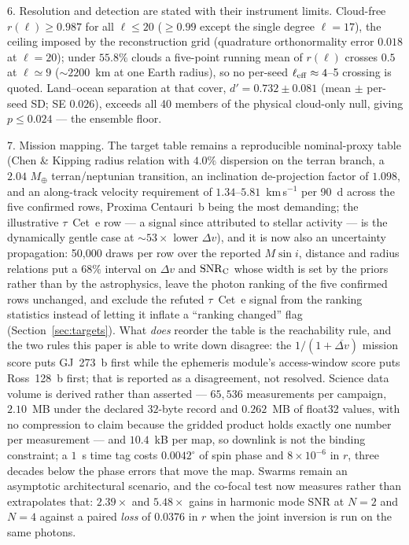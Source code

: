 \documentclass[twocolumn,10pt]{article}
\begin{document}
6. Resolution and detection are stated with their instrument limits.
Cloud-free $r(\ell)\ge0.987$ for all $\ell\le20$ ($\ge0.99$ except the single
degree $\ell=17$), the ceiling imposed by the
reconstruction grid (quadrature orthonormality error $0.018$ at $\ell=20$); under
$55.8\%$ clouds a five-point running mean of $r(\ell)$ crosses $0.5$ at
$\ell\simeq9$ ($\sim2200$~km at one Earth radius), so no per-seed
$\ell_{\rm eff}\approx4$--5 crossing is quoted. Land--ocean separation at that
cover, $d'=0.732\pm0.081$ (mean $\pm$ per-seed SD; SE $0.026$), exceeds all 40 members of the physical cloud-only
null, giving $p\le0.024$ --- the ensemble floor.

7. Mission mapping. The target table remains a reproducible nominal-proxy table
(Chen \& Kipping radius relation with $4.0\%$ dispersion on the terran branch, a
$2.04$ $M_\oplus$ terran/neptunian transition, an inclination de-projection
factor of $1.098$, and an along-track velocity requirement of
$1.34$--$5.81$~km\,s$^{-1}$ per 90~d across the five confirmed rows, Proxima
Centauri~b being the most demanding; the illustrative $\tau$~Cet~e row --- a
signal since attributed to stellar activity \citep{figueira25} --- is the
dynamically gentle case at $\sim53\times$ lower $\Delta v$), and it is now also
an uncertainty propagation: 50{,}000 draws per row over the reported $M\sin i$,
distance and radius relations put a $68\%$ interval on $\Delta v$ and
$\mathrm{SNR}_{\rm C}$ whose width is set by the priors rather than by the
astrophysics, leave the photon ranking of the five confirmed rows unchanged, and
exclude the refuted $\tau$~Cet~e signal from the ranking statistics instead of
letting it inflate a ``ranking changed'' flag (Section~\ref{sec:targets}). What
\emph{does} reorder the table is the reachability rule, and the two rules this
paper is able to write down disagree: the $1/(1+\overline{\Delta v})$ mission
score puts GJ~273~b first while the ephemeris module's access-window score puts
Ross~128~b first; that is reported as a disagreement, not resolved. Science data
volume is derived rather than asserted --- $65{,}536$ measurements per campaign,
$2.10$~MB under the declared $32$-byte record and $0.262$~MB of float32 values,
with no compression to claim because the gridded product holds exactly one
number per measurement --- and $10.4$~kB per map, so downlink is not the binding
constraint; a $1$~s time tag costs $0.0042^\circ$ of spin phase and
$8\times10^{-6}$ in $r$, three decades below the phase errors that move the map.
Swarms remain an asymptotic architectural scenario, and the co-focal test now
measures rather than extrapolates that: $2.39\times$ and $5.48\times$ gains in
harmonic mode SNR at $N=2$ and $N=4$ against a paired \emph{loss} of $0.0376$ in
$r$ when the joint inversion is run on the same photons.
\end{document}
